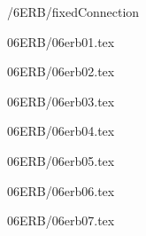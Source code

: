 \documentclass[9pt, xcolor={svgnames, x11names},professionalfonts]{beamer}
\def\scale{1}
\begin{document}
\begin{frame}{/6ERB/fixedConnection}
	\def\scale{0.45}
		
\end{frame}


\begin{frame}{06ERB/06erb01.tex}	
	\def\scale{0.55}	
			
\end{frame}


\begin{frame}{06ERB/06erb02.tex}
		\def\scale{0.55}		
				
\end{frame}


\begin{frame}{06ERB/06erb03.tex}	
	\def\scale{0.55}	
		
\end{frame}


\begin{frame}{06ERB/06erb04.tex}
	\def\scale{0.75}
	
\end{frame}


\begin{frame}{06ERB/06erb05.tex}
	\def\scale{0.675}
	
\end{frame}


\begin{frame}{06ERB/06erb06.tex}	
		\def\scale{1}
		
\end{frame}


\begin{frame}{06ERB/06erb07.tex}	
		\def\scale{0.65}
		
\end{frame}
\end{document}

